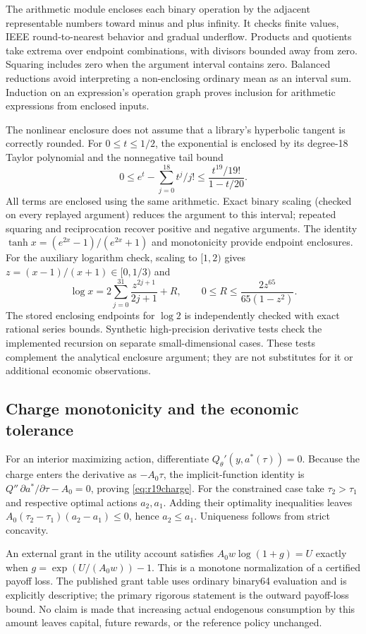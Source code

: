\documentclass[ecta,nameyear,draft]{econsocart}
\theoremstyle{definition}
\theoremstyle{remark}
\begin{document}
The arithmetic module encloses each binary operation by the adjacent
representable numbers toward minus and plus infinity. It checks finite
values, IEEE round-to-nearest behavior and gradual underflow. Products and
quotients take extrema over endpoint combinations, with divisors bounded
away from zero. Squaring includes zero when the argument interval contains
zero. Balanced reductions avoid interpreting a non-enclosing ordinary mean
as an interval sum. Induction on an expression's operation graph proves
inclusion for arithmetic expressions from enclosed inputs.

The nonlinear enclosure does not assume that a library's hyperbolic tangent
is correctly rounded. For $0\leq t\leq1/2$, the exponential is enclosed by
its degree-18 Taylor polynomial and the nonnegative tail bound
\[
 0\leq e^t-\sum_{j=0}^{18}t^j/j!
 \leq \frac{t^{19}/19!}{1-t/20}.
\]
All terms are enclosed using the same arithmetic. Exact binary scaling (checked on every replayed argument) reduces the
argument to this interval; repeated squaring and reciprocation recover
positive and negative arguments. The identity
$\tanh x=(e^{2x}-1)/(e^{2x}+1)$ and monotonicity provide endpoint enclosures.
For the auxiliary logarithm check, scaling to $[1,2)$ gives
$z=(x-1)/(x+1)\in[0,1/3)$ and
\[
 \log x=2\sum_{j=0}^{31}\frac{z^{2j+1}}{2j+1}+R,
 \qquad 0\leq R\leq\frac{2z^{65}}{65(1-z^2)}.
\]
The stored enclosing endpoints for $\log2$ is independently checked with
exact rational series bounds. Synthetic high-precision derivative tests
check the implemented recursion on separate small-dimensional cases.
These tests complement the analytical enclosure argument; they are not
substitutes for it or additional economic observations.

\subsection{Charge monotonicity and the economic tolerance}
For an interior maximizing action, differentiate
$Q_\theta'(y,a^*(\tau))=0$. Because the charge enters the derivative as
$-A_0\tau$, the implicit-function identity is
$Q''\,\partial a^*/\partial\tau-A_0=0$, proving
\eqref{eq:r19charge}. For the constrained case take $\tau_2>\tau_1$ and
respective optimal actions $a_2,a_1$. Adding their optimality inequalities
leaves
$A_0(\tau_2-\tau_1)(a_2-a_1)\leq0$, hence $a_2\leq a_1$.
Uniqueness follows from strict concavity.

An external grant in the utility account satisfies
$A_0w\log(1+g)=U$ exactly when $g=\exp(U/(A_0w))-1$. This is a
monotone normalization of a certified payoff loss. The published grant
table uses ordinary binary64 evaluation and is explicitly descriptive;
the primary rigorous statement is the outward payoff-loss bound. No claim
is made that increasing actual endogenous consumption by this amount leaves
capital, future rewards, or the reference policy unchanged.
\end{document}
